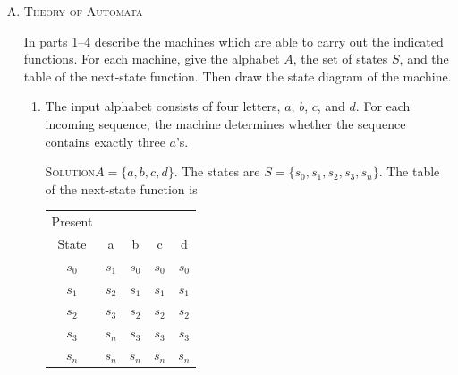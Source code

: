 \documentclass[twoside]{amsart}
\newcommand{\solution}{\textsc{Solution}\xspace}
\begin{document}
\begin{enumerate}[A.]
\begin{enumerate}[1]
      $f$ is surjective.
      \begin{proof}
      Pick some element $y \in B$. Then $y = f(x)$ for $x=g(y)$. 
      Thus, every element $y \in B$ is equal to $f(x)$ for $x=g(y)$.
      Therefore $f$ is surjective.
      \end{proof}

      Since $f$ is injective and surjective it is bijective.

      To prove that $g=f^{-1}$ we must show that $x=g(y)$ if and only if
      $y=f(x)$. This is given.

   \end{enumerate}

   \item \textsc{Theory of Automata}

   In parts 1--4 describe the machines which are able to carry out the 
   indicated functions. For each machine, give the alphabet $A$, 
   the set of states $S$, and the table of the next-state function. Then draw
   the state diagram of the machine.

   \begin{enumerate}[1]
      \item The input alphabet consists of four letters, $a$, $b$, $c$,
      and $d$. For each incoming sequence, the machine determines 
      whether the sequence contains exactly three $a$'s.

      \noindent \solution $A=\{a,b,c,d\}$. The states are 
      $S=\{s_0,s_1,s_2,s_3,s_n\}$. The table of the next-state function
      is

      \vspace{5pt}
      \begin{center}
         \begin{tabular}{c|cccc}
	    Present & \\
	    State &   a   &   b   &   c   &   d   \\ \hline
	    $s_0$ & $s_1$ & $s_0$ & $s_0$ & $s_0$ \\
	    $s_1$ & $s_2$ & $s_1$ & $s_1$ & $s_1$ \\
	    $s_2$ & $s_3$ & $s_2$ & $s_2$ & $s_2$ \\
	    $s_3$ & $s_n$ & $s_3$ & $s_3$ & $s_3$ \\
	    $s_n$ & $s_n$ & $s_n$ & $s_n$ & $s_n$
	 \end{tabular}
      \end{center}


\end{enumerate}
\end{enumerate}
\end{document}
